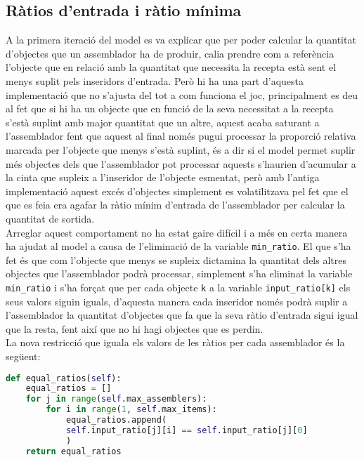 \subsection{Ràtios d'entrada i ràtio mínima}
A la primera iteració del model es va explicar que per poder calcular la quantitat d'objectes que un assemblador ha de produir, calia prendre com a referència l'objecte que en relació amb la quantitat que necessita la recepta està sent el menys suplit pels inseridors d'entrada. Però hi ha una part d'aquesta implementació que no s'ajusta del tot a com funciona el joc, principalment es deu al fet que si hi ha un objecte que en funció de la seva necessitat a la recepta s'està suplint amb major quantitat que un altre, aquest acaba saturant a l'assemblador fent que aquest al final només pugui processar la proporció relativa marcada per l'objecte que menys s'està suplint, és a dir si el model permet suplir més objectes dels que l'assemblador pot processar aquests s'haurien d'acumular a la cinta que supleix a l'inseridor de l'objecte esmentat, però amb l'antiga implementació aquest excés d'objectes simplement es volatilitzava pel fet que el que es feia era agafar la ràtio mínim d'entrada de l'assemblador per calcular la quantitat de sortida.\\
Arreglar aquest comportament no ha estat gaire difícil i a més en certa manera ha ajudat al model a causa de l'eliminació de la variable \lstinline{min_ratio}. El que s'ha fet és que com l'objecte que menys se supleix dictamina la quantitat dels altres objectes que l'assemblador podrà processar, simplement s'ha eliminat la variable \lstinline{min_ratio} i s'ha forçat que per cada objecte \lstinline{k} a la variable \lstinline{input_ratio[k]} els seus valors siguin iguals, d'aquesta manera cada inseridor només podrà suplir a l'assemblador la quantitat d'objectes que fa que la seva ràtio d'entrada sigui igual que la resta, fent així que no hi hagi objectes que es perdin.\\

La nova restricció que iguala els valors de les ràtios per cada assemblador és la següent:

\begin{lstlisting}[language=Python, caption=Equal Ratios]
def equal_ratios(self):
    equal_ratios = []
    for j in range(self.max_assemblers):
        for i in range(1, self.max_items):
            equal_ratios.append(
            self.input_ratio[j][i] == self.input_ratio[j][0]
            )
    return equal_ratios
\end{lstlisting}

